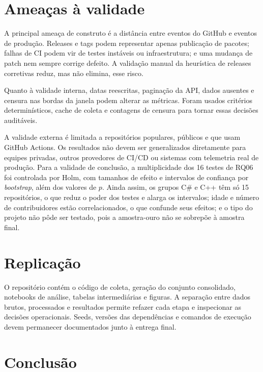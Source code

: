 \documentclass[12pt]{article}
\begin{document}
\section{Ameaças à validade}

A principal ameaça de construto é a distância entre eventos do GitHub e
eventos de produção. Releases e tags podem representar apenas publicação de
pacotes; falhas de CI podem vir de testes instáveis ou infraestrutura; e uma
mudança de patch nem sempre corrige defeito. A validação manual da heurística
de releases corretivas reduz, mas não elimina, esse risco.

Quanto à validade interna, datas reescritas, paginação da API, dados ausentes
e censura nas bordas da janela podem alterar as métricas. Foram usados
critérios determinísticos, cache de coleta e contagens de censura para tornar
essas decisões auditáveis.

A validade externa é limitada a repositórios populares, públicos e que usam
GitHub Actions. Os resultados não devem ser generalizados diretamente para
equipes privadas, outros provedores de CI/CD ou sistemas com telemetria real
de produção. Para a validade de conclusão, a multiplicidade dos 16 testes de
RQ06 foi controlada por Holm, com tamanhos de efeito e intervalos de
confiança por \textit{bootstrap}, além dos valores de $p$. Ainda assim, os
grupos C\# e C++ têm só 15 repositórios, o que reduz o poder dos testes e
alarga os intervalos; idade e número de contribuidores estão
correlacionados, o que confunde seus efeitos; e o tipo do projeto não pôde
ser testado, pois a amostra-ouro não se sobrepõe à amostra final.

\section{Replicação}

O repositório contém o código de coleta, geração do conjunto consolidado,
notebooks de análise, tabelas intermediárias e figuras. A separação entre
dados brutos, processados e resultados permite refazer cada etapa e inspecionar
as decisões operacionais. Seeds, versões das dependências e comandos de
execução devem permanecer documentados junto à entrega final.

\section{Conclusão}
\end{document}
